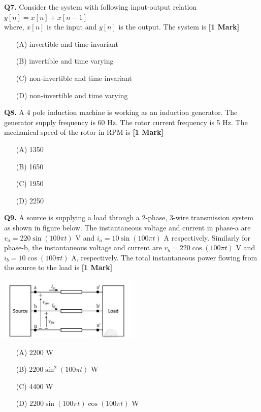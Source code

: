 \documentclass[11pt]{article}
\newcommand{\questiona}[2]{
    \noindent\textbf{Q#2.} #1 \hfill \textbf{[1 Mark]}
}
\begin{document}
\questiona{Consider the system with following input-output relation \\
\( y[n] = x[n] + x[n - 1] \) \\
where, \( x[n] \) is the input and \( y[n] \) is the output. The system is}{7}
\begin{enumerate}
    \item[(A)] invertible and time invariant  
    \item[(B)] invertible and time varying  
    \item[(C)] non-invertible and time invariant  
    \item[(D)] non-invertible and time varying  
\end{enumerate}
\vspace{0.5cm}

\questiona{A 4 pole induction machine is working as an induction generator. The generator supply frequency is 60 Hz. The rotor current frequency is 5 Hz. The mechanical speed of the rotor in RPM is}{8}
\begin{enumerate}
    \item[(A)] 1350  
    \item[(B)] 1650  
    \item[(C)] 1950  
    \item[(D)] 2250  
\end{enumerate}
\vspace{0.5cm}

\questiona{A source is supplying a load through a 2-phase, 3-wire transmission system as shown in figure below. The instantaneous voltage and current in phase-a are \( v_a = 220\sin(100\pi t) \) V and \( i_a = 10\sin(100\pi t) \) A respectively. Similarly for phase-b, the instantaneous voltage and current are \( v_b = 220\cos(100\pi t) \) V and \( i_b = 10\cos(100\pi t) \) A, respectively. The total instantaneous power flowing from the source to the load is}{9}
\begin{center}
\includegraphics[width=0.5\textwidth]{figures/9.png}
\end{center}
\begin{enumerate}
    \item[(A)] 2200 W  
    \item[(B)] \( 2200\sin^2(100\pi t) \) W  
    \item[(C)] 4400 W  
    \item[(D)] \( 2200\sin(100\pi t)\cos(100\pi t) \) W  
\end{enumerate}
\vspace{0.5cm}
\end{document}
